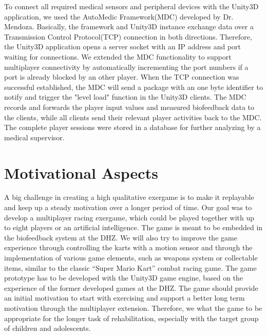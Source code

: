 \begin{multicols}{2}
To connect all required medical sensors and peripheral devices with the Unity3D application, we used the AutoMedic Framework(MDC) developed by Dr. Mendoza\cite{Mendoza2011AutoMedic}. Basically, the framework and Unity3D instance exchange data over a Transmission Control Protocol(TCP) connection in both directions. Therefore, the Unity3D application opens a server socket with an IP address and port waiting for connections. We extended the MDC functionality to support multiplayer connectivity by automatically incrementing the port numbers if a port is already blocked by an other player. When the TCP connection was successful established, the MDC will send a package with an one byte identifier to notify and trigger the "level load" function in the Unity3D clients. The MDC records and forwards the player input values and measured biofeedback data to the clients, while all clients send their relevant player activities back to the MDC. The complete player sessions were stored in a database for further analyzing by a medical supervisor.



\section{Motivational Aspects}

A big challenge in creating a high qualitative exergame is to make it replayable and keep up a steady motivation over a longer period of time. Our goal was to develop a multiplayer racing exergame, which could be played together with up to eight players or an artificial intelligence. The game is meant to be embedded in the biofeedback system at the DHZ. We will also try to improve the game experience through controlling the karts with a motion sensor and through the implementation of various game elements, such as weapons system or collectable items, similar to the classic “Super Mario Kart” \cite{NitendoWiiMario} combat racing game. The game prototype has to be developed with the Unity3D game engine, based on the experience of the former developed games at the DHZ. The game should provide an initial motivation to start with exercising and support a better long term motivation through the multiplayer extension. Therefore, we what the game to be appropriate for the longer task of rehabilitation, especially with the target group of children and adolescents. 


\end{multicols}
